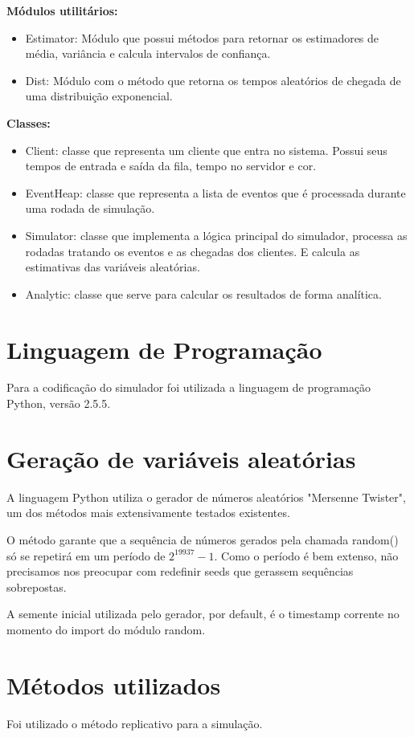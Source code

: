 \textbf{Módulos utilitários:}

\begin{itemize}
  \item Estimator: Módulo que possui métodos para retornar os estimadores de média, variância e calcula intervalos de confiança.
  \item Dist: Módulo com o método que retorna os tempos aleatórios de chegada de uma distribuição exponencial.
\end{itemize}

\textbf{Classes:}

\begin{itemize}
  \item Client: classe que representa um cliente que entra no sistema. Possui seus tempos de entrada e saída da fila, tempo no servidor e cor.
  \item EventHeap: classe que representa a lista de eventos que é processada durante uma rodada de simulação.
  \item Simulator: classe que implementa a lógica principal do simulador, processa as rodadas tratando os eventos e as chegadas dos clientes. E calcula as estimativas das variáveis aleatórias.
  \item Analytic: classe que serve para calcular os resultados de forma analítica.
\end{itemize}

\section{Linguagem de Programação}
Para a codificação do simulador foi utilizada a linguagem de programação Python, versão 2.5.5.

\section{Geração de variáveis aleatórias}
A linguagem Python utiliza o gerador de números aleatórios "Mersenne Twister", um dos métodos mais extensivamente testados existentes. 

O método garante que a sequência de números gerados pela chamada random() só se repetirá em um período de $2^{19937}-1$. Como o período é bem extenso, não precisamos nos preocupar com redefinir seeds que gerassem sequências sobrepostas.

A semente inicial utilizada pelo gerador, por default, é o timestamp corrente no momento do import do módulo random.

\section{Métodos utilizados}
Foi utilizado o método replicativo para a simulação.

